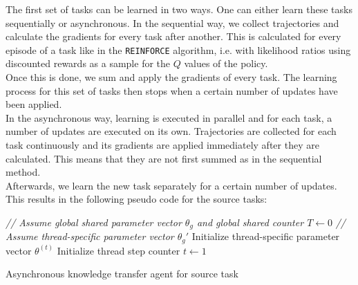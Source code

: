 \documentclass[a4paper]{article}
\begin{document}
The first set of tasks can be learned in two ways. One can either learn these tasks sequentially or asynchronous. In the sequential way, we collect trajectories and calculate the gradients for every task after another. This is calculated for every episode of a task like in the \texttt{REINFORCE} algorithm, i.e. with likelihood ratios using discounted rewards as a sample for the $Q$ values of the policy.\\
Once this is done, we sum and apply the gradients of every task. The learning process for this set of tasks then stops when a certain number of updates have been applied.\\
In the asynchronous way, learning is executed in parallel and for each task, a number of updates are executed on its own. Trajectories are collected for each task continuously and its gradients are applied immediately after they are calculated. This means that they are not first summed as in the sequential method.\\
Afterwards, we learn the new task separately for a certain number of updates.\\
This results in the following pseudo code for the source tasks:\\
\begin{algorithm}[H]
\DontPrintSemicolon
\emph{// Assume global shared parameter vector $\theta_g$ and global shared counter $T \gets 0$}\;
\emph{// Assume thread-specific parameter vector $\theta_g'$}\;
Initialize thread-specific parameter vector $\theta^{(t)}$\;
Initialize thread step counter $t\gets 1$\;
\caption{Asynchronous knowledge transfer agent for source task}
\end{algorithm}
\end{document}
